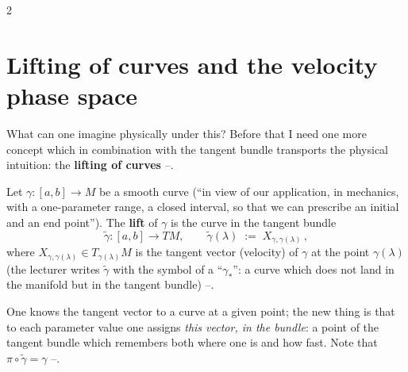 \begin{paracol}{2}
\section{Lifting of curves and the velocity phase space}\label{sec:lag-lift}

What can one imagine physically under this? Before that I need one more concept which in combination with the tangent bundle transports the physical intuition: the \textbf{lifting of curves} --.

\begin{definition}\label{def:lag-lift}
Let $\gamma\colon[a,b]\to M$ be a smooth curve (``in view of our application, in mechanics, with a one-parameter range, a closed interval, so that we can prescribe an initial and an end point''). The \textbf{lift} of $\gamma$ is the curve in the tangent bundle
\begin{equation}\label{eq:lag-lift}
  \tilde\gamma\colon[a,b]\to TM,\qquad \tilde\gamma(\lambda)\;:=\;X_{\gamma,\gamma(\lambda)}\,,
\end{equation}
where $X_{\gamma,\gamma(\lambda)}\in T_{\gamma(\lambda)}M$ is the tangent vector (velocity) of $\gamma$ at the point $\gamma(\lambda)$ (the lecturer writes $\tilde\gamma$ with the symbol of a ``$\gamma_*$'': a curve which does not land in the manifold but in the tangent bundle) --.
\end{definition}
One knows the tangent vector to a curve at a given point; the new thing is that to each parameter value one assigns \emph{this vector, in the bundle}: a point of the tangent bundle which remembers both where one is and how fast. Note that $\pi\circ\tilde\gamma=\gamma$ --.


\end{paracol}

